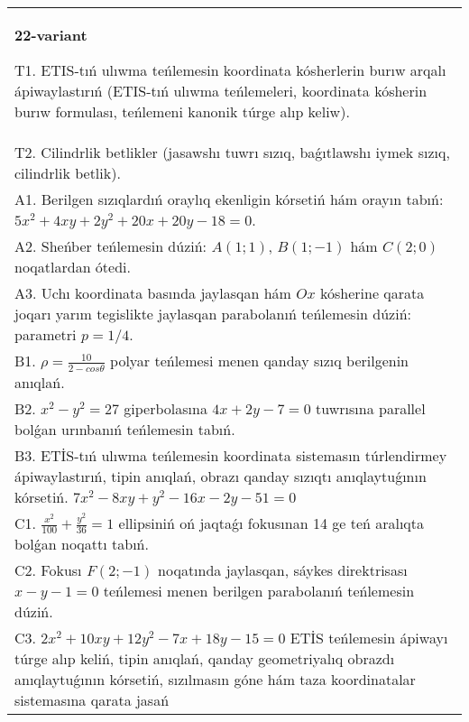 \documentclass{article}
\begin{document}
\begin{tabular}{m{17cm}}
\textbf{22-variant}
\newline

T1. ETIS-tıń ulıwma teńlemesin koordinata kósherlerin burıw arqalı ápiwaylastırıń (ETIS-tıń ulıwma teńlemeleri, koordinata kósherin burıw formulası, teńlemeni kanonik túrge alıp keliw).\\

T2. Cilindrlik betlikler (jasawshı tuwrı sızıq, baǵıtlawshı iymek sızıq, cilindrlik betlik).\\

A1. Berilgen sızıqlardıń oraylıq ekenligin kórsetiń hám orayın tabıń: $5 x^{2}+4 xy+2 y^{2}+20 x+20 y-18=0$.\\

A2. Sheńber teńlemesin dúziń: $A (1;1) $, $B (1;-1) $ hám $C (2;0) $ noqatlardan ótedi.\\

A3. Uchı koordinata basında jaylasqan hám $Ox$ kósherine qarata joqarı yarım tegislikte jaylasqan parabolanıń teńlemesin dúziń: parametri $p=1/4$.\\

B1. $\rho = \frac{10}{2 - cos\theta}$ polyar teńlemesi menen qanday sızıq berilgenin anıqlań.  \\

B2. $x^{2} - y^{2} = 27$ giperbolasına $4x + 2y - 7 = 0$ tuwrısına parallel bolǵan urınbanıń teńlemesin tabıń.  \\

B3. ETİS-tıń ulıwma teńlemesin koordinata sistemasın túrlendirmey ápiwaylastırıń, tipin anıqlań, obrazı qanday sızıqtı anıqlaytuǵının kórsetiń. $7x^{2} - 8xy + y^{2} - 16x - 2y - 51 = 0$  \\

C1. $\frac{x^{2}}{100} + \frac{y^{2}}{36} = 1$ ellipsiniń oń jaqtaǵı fokusınan 14 ge teń aralıqta bolǵan noqattı tabıń.  \\

C2. Fokusı $F(2; - 1)$ noqatında jaylasqan, sáykes direktrisası $x - y - 1 = 0$ teńlemesi menen berilgen parabolanıń teńlemesin dúziń.  \\

C3. $2x^{2} + 10xy + 12y^{2} - 7x + 18y - 15 = 0$ ETİS teńlemesin ápiwayı túrge alıp keliń, tipin anıqlań, qanday geometriyalıq obrazdı anıqlaytuǵının kórsetiń, sızılmasın góne hám taza koordinatalar sistemasına qarata jasań  \\

\end{tabular}
\vspace{1cm}
\end{document}
